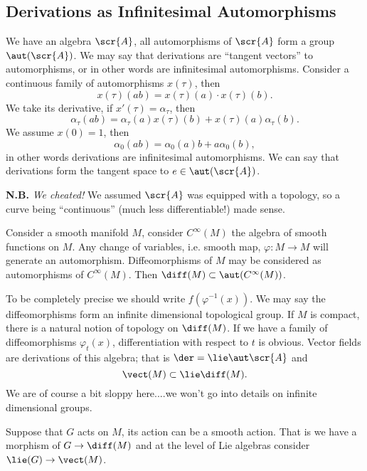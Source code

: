 \subsection{Derivations as Infinitesimal Automorphisms}
We have an algebra $\scr{A}$, all automorphisms of $\scr{A}$ form
a group $\aut(\scr{A})$. We may say that derivations are
``tangent vectors'' to automorphisms, or in other words are
infinitesimal automorphisms. Consider a continuous family of
automorphisms $x(\tau)$, then 
\begin{equation}
x(\tau)(ab)=x(\tau)(a)\cdot x(\tau)(b).
\end{equation}
We take its derivative, if $x'(\tau)=\alpha_{\tau}$, then
\begin{equation}
\alpha_{\tau}(ab)=\alpha_{\tau}(a)x(\tau)(b)+x(\tau)(a)\alpha_{\tau}(b).
\end{equation}
We assume $x(0)=1$, then
\begin{equation}
\alpha_{0}(ab)=\alpha_{0}(a)b+a\alpha_{0}(b),
\end{equation}
in other words derivations are infinitesimal automorphisms. We
can say that derivations form the tangent space to
$e\in\aut(\scr{A})$.

\noindent\textbf{N.B.} \emph{We cheated!} We assumed $\scr{A}$
was equipped with a topology, so a curve being ``continuous''
(much less differentiable!) made sense. 

Consider a smooth manifold $M$, consider $C^{\infty}(M)$ the
algebra of smooth functions on $M$. Any change of variables,
i.e. smooth map, $\varphi\colon M\to M$ will generate an
automorphism. Diffeomorphisms of $M$ may be considered as
automorphisms of $C^{\infty}(M)$. Then $\diff(M)\subset\aut(C^{\infty}(M))$.

To be completely precise we should write $f(\varphi^{-1}(x))$. We
may say the diffeomorphisms form an infinite dimensional
topological group. If $M$ is compact, there is a natural notion
of topology on $\diff(M)$. If we have a family of diffeomorphisms
$\varphi_{t}(x)$, differentiation with respect to $t$ is
obvious. Vector fields are derivations of this algebra; that is
$\der=\lie\aut\scr{A}$ and
\begin{equation}
\vect(M)\subset\lie\diff(M).
\end{equation}
We are of course a bit sloppy here....we won't go into details on
infinite dimensional groups.

Suppose that $G$ acts on $M$, its action can be a smooth
action. That is we have a morphism of $G\to\diff(M)$ and at the
level of Lie algebras consider $\lie(G)\to\vect(M)$.
